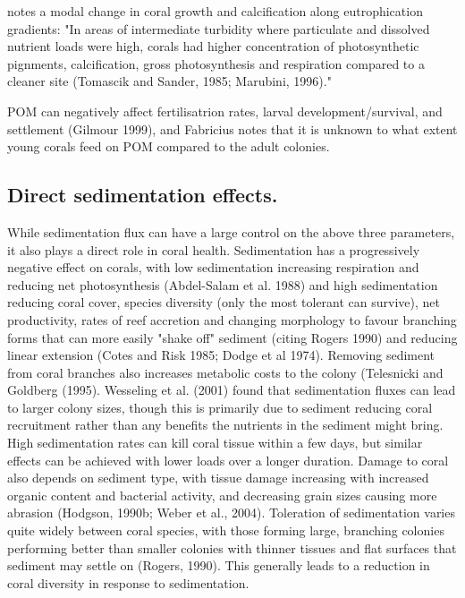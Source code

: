 \documentclass[11pt,a4paper]{article}
\begin{document}
\cite{Fabricius2005} notes a modal change in coral growth and calcification along eutrophication gradients: "In areas of intermediate turbidity where particulate and dissolved nutrient loads were high, corals had higher concentration of photosynthetic pignments, calcification, gross photosynthesis and respiration compared to a cleaner site (Tomascik and Sander, 1985; Marubini, 1996)." 

POM can negatively affect fertilisatrion rates, larval development/survival, and settlement (Gilmour 1999), and Fabricius notes that it is unknown to what extent young corals feed on POM compared to the adult colonies.


\subsection{Direct sedimentation effects.}

While sedimentation flux can have a large control on the above three parameters, it also plays a direct role in coral health.
Sedimentation has a progressively negative effect on corals, with low sedimentation increasing respiration and reducing net photosynthesis (Abdel-Salam et al. 1988) and high sedimentation reducing coral cover, species diversity (only the most tolerant can survive), net productivity, rates of reef accretion and changing morphology to favour branching forms that can more easily "shake off" sediment (citing Rogers 1990) and reducing linear extension (Cotes and Risk 1985; Dodge et al 1974). Removing sediment from coral branches also increases metabolic costs to the colony (Telesnicki and Goldberg (1995).
Wesseling et al. (2001) found that sedimentation fluxes can lead to larger colony sizes, though this is primarily due to sediment reducing coral recruitment rather than any benefits the nutrients in the sediment might bring. 
High sedimentation rates can kill coral tissue within a few days, but similar effects can be achieved with lower loads over a longer duration. Damage to coral also depends on sediment type, with tissue damage increasing with increased organic content and bacterial activity, and decreasing grain sizes causing more abrasion (Hodgson, 1990b; Weber et al., 2004). 
Toleration of sedimentation varies quite widely between coral species, with those forming large, branching colonies performing better than smaller colonies with thinner tissues and flat surfaces that sediment may settle on (Rogers, 1990). This generally leads to a reduction in coral diversity in response to sedimentation.
\end{document}

